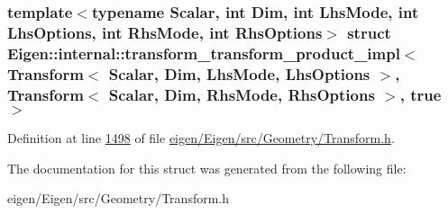 \subsubsection*{template$<$typename Scalar, int Dim, int Lhs\+Mode, int Lhs\+Options, int Rhs\+Mode, int Rhs\+Options$>$\newline
struct Eigen\+::internal\+::transform\+\_\+transform\+\_\+product\+\_\+impl$<$ Transform$<$ Scalar, Dim, Lhs\+Mode, Lhs\+Options $>$, Transform$<$ Scalar, Dim, Rhs\+Mode, Rhs\+Options $>$, true $>$}



Definition at line \hyperlink{eigen_2_eigen_2src_2_geometry_2_transform_8h_source_l01498}{1498} of file \hyperlink{eigen_2_eigen_2src_2_geometry_2_transform_8h_source}{eigen/\+Eigen/src/\+Geometry/\+Transform.\+h}.



The documentation for this struct was generated from the following file\+:\begin{DoxyCompactItemize}
\item 
eigen/\+Eigen/src/\+Geometry/\+Transform.\+h\end{DoxyCompactItemize}
